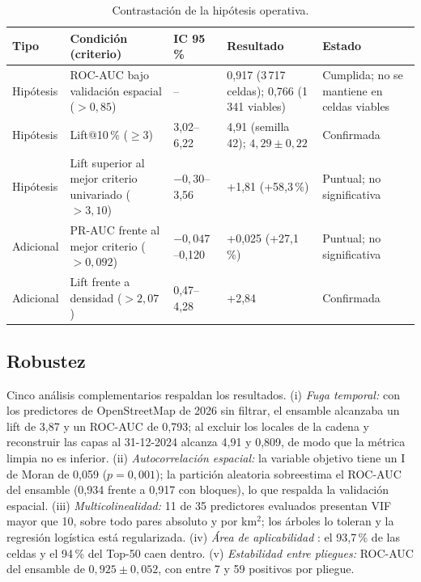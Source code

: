 \documentclass[10pt,letterpaper,twocolumn]{article}
\begin{document}
\begin{table}[t]
\centering
\caption{Contrastación de la hipótesis operativa.}
\label{tab:hip}
\small
\begin{tabular}{p{1.9cm}p{4.1cm}p{1.9cm}p{4.1cm}p{3.3cm}}
\toprule
Tipo & Condición (criterio) & IC 95\,\% & Resultado & Estado \\
\midrule
Hipótesis & ROC-AUC bajo validación espacial ($>0{,}85$) & -- & 0,917 (3\,717 celdas); 0,766 (1\,341 viables) & Cumplida; no se mantiene en celdas viables \\
Hipótesis & Lift@10\,\% ($\geq3$) & 3,02--6,22 & 4,91 (semilla 42); $4{,}29\pm0{,}22$ & Confirmada \\
Hipótesis & Lift superior al mejor criterio univariado ($>3{,}10$) & $-0{,}30$--3,56 & +1,81 (+58,3\,\%) & Puntual; no significativa \\
Adicional & PR-AUC frente al mejor criterio ($>0{,}092$) & $-0{,}047$--0,120 & +0,025 (+27,1\,\%) & Puntual; no significativa \\
Adicional & Lift frente a densidad ($>2{,}07$) & 0,47--4,28 & +2,84 & Confirmada \\
\bottomrule
\end{tabular}
\end{table}

\subsection{Robustez}

Cinco análisis complementarios respaldan los resultados. (i) \textit{Fuga temporal:} con los predictores de OpenStreetMap de 2026 sin filtrar, el ensamble alcanzaba un lift de 3,87 y un ROC-AUC de 0,793; al excluir los locales de la cadena y reconstruir las capas al 31-12-2024 alcanza 4,91 y 0,809, de modo que la métrica limpia no es inferior. (ii) \textit{Autocorrelación espacial:} la variable objetivo tiene un I de Moran de 0,059 ($p=0{,}001$); la partición aleatoria sobreestima el ROC-AUC del ensamble (0,934 frente a 0,917 con bloques), lo que respalda la validación espacial. (iii) \textit{Multicolinealidad:} 11 de 35 predictores evaluados presentan VIF mayor que 10, sobre todo pares absoluto y por km$^2$; los árboles lo toleran y la regresión logística está regularizada. (iv) \textit{Área de aplicabilidad} \citep{meyer2021}: el 93,7\,\% de las celdas y el 94\,\% del Top-50 caen dentro. (v) \textit{Estabilidad entre pliegues:} ROC-AUC del ensamble de $0{,}925\pm0{,}052$, con entre 7 y 59 positivos por pliegue.
\end{document}
